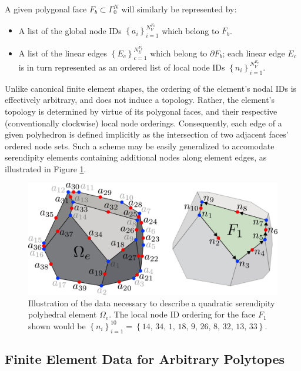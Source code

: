 	A given polygonal face $F_b \subset \Gamma^N_0$ will similarly be represented by:
	\begin{itemize}
		\item A list of the global node IDs $\left\{ a_i \right\}_{i=1}^{N^{F_b}_V}$ which belong to $F_b$.
		\item A list of the linear edges $\left\{ E_{c} \right\}_{c=1}^{N^{F_b}_E}$ which belong to $\partial F_b$; each linear edge $E_c$ is in turn represented as an ordered list of local node IDs $\left\{ n_i \right\}_{i=1}^{N^{E_c}_V}$.
	\end{itemize}
	
	Unlike canonical finite element shapes, the ordering of the element's nodal IDs is effectively arbitrary, and does not induce a topology. Rather, the element's topology is determined by virtue of its polygonal faces, and their respective (conventionally clockwise) local node orderings. Consequently, each edge of a given polyhedron is defined implicitly as the intersection of two adjacent faces' ordered node sets. Such a scheme may be easily generalized to accomodate serendipity elements containing additional nodes along element edges, as illustrated in Figure \ref{fig:polyhedron_data_quadratic}.
	\begin{figure} [!ht]
		\centering
		\includegraphics[width = 6.0in]{figures/polyhedron_data_quadratic.pdf}
		\caption{Illustration of the data necessary to describe a quadratic serendipity polyhedral element $\Omega_e$. The local node ID ordering for the face $F_1$ shown would be $\left\{ n_i \right\}_{i=1}^{10} = \left\{ 14, \, 34, \, 1, \, 18, \, 9, \, 26, \, 8, \, 32, \, 13, \, 33 \right\}$.}
		\label{fig:polyhedron_data_quadratic}
	\end{figure}
	
\subsection*{Finite Element Data for Arbitrary Polytopes}

